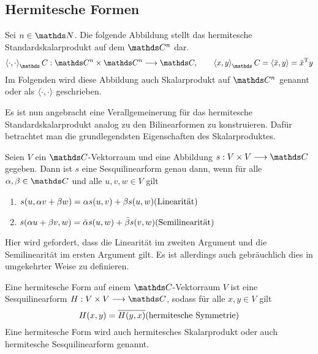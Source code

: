 	
		\subsection{Hermitesche Formen} %
		\label{sub:hermitesche_formen}

			\begin{definition}
				Sei $n\in\SN$.
				Die folgende Abbildung stellt das hermitesche Standardskalarprodukt auf dem $\SC^n$ dar.
				\[ \angleb{\cdot,\cdot}_\SC:\SC^n\times\SC^n\longrightarrow\SC,\qquad \angleb{x,y}_\SC = \angleb{\bar{x},y} = \bar{x}\transp y \]
				Im Folgenden wird diese Abbildung auch Skalarprodukt auf $\SC^n$ genannt oder als $\left\langle \cdot,\cdot \right\rangle$ geschrieben.
			\end{definition}

			Es ist nun angebracht eine Verallgemeinerung für das hermitesche Standardskalarprodukt analog zu den Bilinearformen zu konstruieren.
			Dafür betrachtet man die grundlegendsten Eigenschaften des Skalarproduktes. 

			\begin{definition}[Sesquilinearform]
				Seien $V$ ein $\SC$-Vektorraum und eine Abbildung $s:V\times V\longrightarrow \SC$ gegeben.
				Dann ist $s$ eine Sesquilinearform genau dann, wenn für alle $\alpha,\beta\in\SC$ und alle $u,v,w\in V$ gilt
				\begin{enumerate}[label = \normalfont (S\arabic*)]
					\item $s(u, \alpha v + \beta w) = \alpha s(u,v) + \beta s(u,w) \hfill \text{(Linearität)}$
					\item $s(\alpha u + \beta v, w) = \bar{\alpha} s(u,w) + \bar{\beta}s(v,w) \hfill \text{(Semilinearität)}$
				\end{enumerate}
			\end{definition}

			Hier wird gefordert, dass die Linearität im zweiten Argument und die Semilinearität im ersten Argument gilt.
			Es ist allerdings auch gebräuchlich dies in umgekehrter Weise zu definieren.

			\begin{definition}
				Eine hermitesche Form auf einem $\SC$-Vektorraum $V$ ist eine Sesquilinearform $H:V\times V\longrightarrow\SC$, sodass für alle $x,y\in V$ gilt
				\[ H(x,y) = \overline{H(y,x)} \hfill \text{(hermitesche Symmetrie)} \]
				Eine hermitesche Form wird auch hermitesches Skalarprodukt oder auch hermitesche Sesquilinearform genannt.
			\end{definition}

